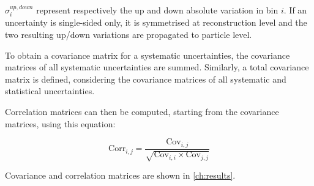 \(\sigma^{up, down}_{i}\) represent respectively the up and down absolute variation in bin \(i\). If an uncertainty is single-sided only, it is symmetrised at reconstruction level and the two resulting up/down variations are propagated to particle level.

To obtain a covariance matrix for a systematic uncertainties, the covariance matrices of all systematic uncertainties are summed. Similarly, a total covariance matrix is defined, considering the covariance matrices of all systematic and statistical uncertainties.

Correlation matrices can then be computed, starting from the covariance matrices, using this equation:

\begin{equation}\label{eq:corr_matrix}
    \mathrm{Corr}_{i,j} = \frac{\mathrm{Cov}_{i,j}}{\sqrt{\mathrm{Cov}_{i,i} \times \mathrm{Cov}_{j,j}}}
\end{equation}

Covariance and correlation matrices are shown in \cref{ch:results}.
